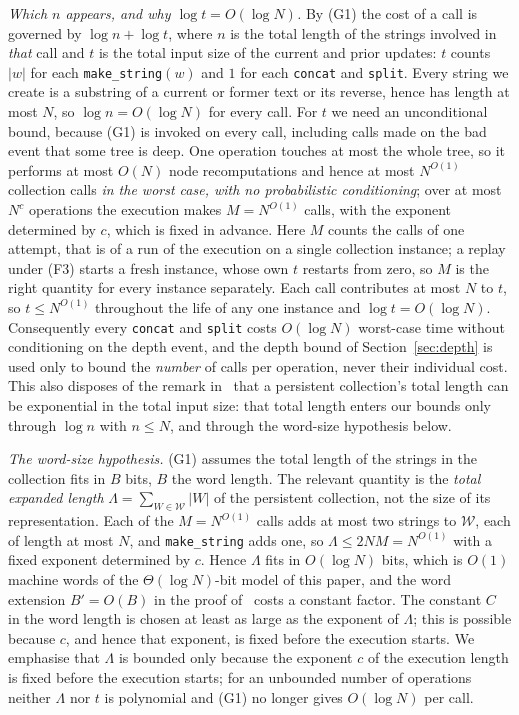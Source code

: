 ﻿\documentclass[11pt]{article}
\theoremstyle{plain}
\theoremstyle{remark}
\begin{document}
\emph{Which $n$ appears, and why $\log t=O(\log N)$.} By (G1) the cost of a call is governed by $\log n+\log t$, where $n$ is the total length of the strings involved in \emph{that} call and $t$ is the total input size of the current and prior updates: $t$ counts $|w|$ for each \texttt{make\_string}$(w)$ and $1$ for each \texttt{concat} and \texttt{split}. Every string we create is a substring of a current or former text or its reverse, hence has length at most $N$, so $\log n=O(\log N)$ for every call. For $t$ we need an unconditional bound, because (G1) is invoked on every call, including calls made on the bad event that some tree is deep. One operation touches at most the whole tree, so it performs at most $O(N)$ node recomputations and hence at most $N^{O(1)}$ collection calls \emph{in the worst case, with no probabilistic conditioning}; over at most $N^c$ operations the execution makes $M=N^{O(1)}$ calls, with the exponent determined by $c$, which is fixed in advance. Here $M$ counts the calls of one attempt, that is of a run of the execution on a single collection instance; a replay under (F3) starts a fresh instance, whose own $t$ restarts from zero, so $M$ is the right quantity for every instance separately. Each call contributes at most $N$ to $t$, so $t\le N^{O(1)}$ throughout the life of any one instance and $\log t=O(\log N)$. Consequently every \texttt{concat} and \texttt{split} costs $O(\log N)$ worst-case time without conditioning on the depth event, and the depth bound of Section~\ref{sec:depth} is used only to bound the \emph{number} of calls per operation, never their individual cost. This also disposes of the remark in~\cite[\S1]{GKK} that a persistent collection's total length can be exponential in the total input size: that total length enters our bounds only through $\log n$ with $n\le N$, and through the word-size hypothesis below.

\emph{The word-size hypothesis.} (G1) assumes the total length of the strings in the collection fits in $B$ bits, $B$ the word length. The relevant quantity is the \emph{total expanded length} $\Lambda=\sum_{W\in\mathcal W}|W|$ of the persistent collection, not the size of its representation. Each of the $M=N^{O(1)}$ calls adds at most two strings to $\mathcal W$, each of length at most $N$, and \texttt{make\_string} adds one, so $\Lambda\le 2NM=N^{O(1)}$ with a fixed exponent determined by $c$. Hence $\Lambda$ fits in $O(\log N)$ bits, which is $O(1)$ machine words of the $\Theta(\log N)$-bit model of this paper, and the word extension $B'=O(B)$ in the proof of~\cite[Thm.~6.12]{GKK} costs a constant factor. The constant $C$ in the word length is chosen at least as large as the exponent of $\Lambda$; this is possible because $c$, and hence that exponent, is fixed before the execution starts. We emphasise that $\Lambda$ is bounded only because the exponent $c$ of the execution length is fixed before the execution starts; for an unbounded number of operations neither $\Lambda$ nor $t$ is polynomial and (G1) no longer gives $O(\log N)$ per call.
\end{document}

